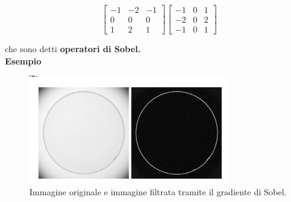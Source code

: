 \begin{center}
    \[
        \begin{bmatrix}
            -1 & -2 & -1 \\
            0  & 0  & 0  \\
            1  & 2  & 1
        \end{bmatrix}
        \begin{bmatrix}
            -1 & 0 & 1 \\
            -2 & 0 & 2 \\
            -1 & 0 & 1
        \end{bmatrix}
    \]
\end{center}
che sono detti \textbf{operatori di Sobel.}
\\\textbf{Esempio}
\begin{figure}[H]
    \centering
    \includegraphics[width=\linewidth, keepaspectratio]{capitoli/immagini/imgs/sobel.png}
    \caption*{Immagine originale e immagine filtrata tramite il gradiente di Sobel.}
\end{figure}

